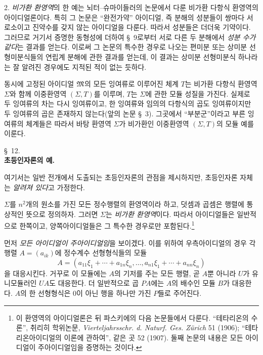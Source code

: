 2. \emph{비가환 환영역}의 한 예는 뇌터--슈마이들러의 논문에서 다룬 비가환 다항식 환영역의 아이디얼론이다. 특히 그 논문은 ``완전가약'' 아이디얼, 즉 분해의 성분들이 쌍마다 서로소이고 진약수를 갖지 않는 아이디얼을 다룬다. 따라서 성분들은 더더욱 기약이다. 그러므로 거기서 증명한 동형성에 더하여 \S~9로부터 서로 다른 두 분해에서 \emph{성분 수가 같다}는 결과를 얻는다. 이로써 그 논문의 특수한 경우로 나오는 편미분 또는 상미분 선형미분식들의 연립계 분해에 관한 결과를 얻는데, 이 결과는 상미분 선형미분식 하나라는 잘 알려진 경우에도 지적된 적이 없는 듯하다.

동시에 고정된 아이디얼 $\mathfrak{M}$의 모든 잉여류로 이루어진 체계 $T$는 비가환 다항식 환영역 $\Sigma$와 함께 이중환영역 $(\Sigma,T)$를 이루며, $T$는 $\Sigma$에 관한 모듈 성질을 가진다. 실제로 두 잉여류의 차는 다시 잉여류이고, 한 잉여류와 임의의 다항식의 곱도 잉여류이지만 두 잉여류의 곱은 존재하지 않는다(앞의 논문 \S~3). 그곳에서 ``부분군''이라고 부른 잉여류의 체계들은 따라서 바탕 환영역 $\Sigma$가 비가환인 이중환영역 $(\Sigma,T)$의 모듈 예를 이룬다.

\begin{center}
\S~12.\\[0.25em]
\textbf{초등인자론의 예.}
\end{center}

여기서는 일반 전개에서 도출되는 초등인자론의 관점을 제시하지만, 초등인자론 자체는 \emph{알려져 있다}고 가정한다.

$\Sigma$를 $n^2$개의 원소를 가진 모든 정수행렬의 환영역이라 하고, 덧셈과 곱셈은 행렬에 통상적인 뜻으로 정의하자. 그러면 $\Sigma$는 \emph{비가환 환영역}이다. 따라서 아이디얼들은 일반적으로 한쪽이고, 양쪽아이디얼들은 그 특수한 경우로만 포함된다.\footnote{이 환영역의 아이디얼론은 뒤 파스키에의 다음 논문들에서 다룬다. ``테타리온의 수론'', 취리히 학위논문, \emph{Vierteljahrsschr. d. Naturf. Ges. Zürich} 51 (1906); ``테타리온아이디얼의 이론에 관하여'', 같은 곳 52 (1907). 둘째 논문의 내용은 모든 아이디얼이 주아이디얼임을 증명하는 것이다.}

먼저 \emph{모든 아이디얼이 주아이디얼임}을 보이겠다. 이를 위하여 우측아이디얼의 경우 각 행렬 $A=(a_{ik})$에 정수계수 선형형식들의 모듈
\[
 A=(a_{11}\xi_1+\cdots+a_{1n}\xi_n,\ldots,
 a_{n1}\xi_1+\cdots+a_{nn}\xi_n)
\]
을 대응시킨다. 거꾸로 이 모듈에는 $A$의 기저를 주는 모든 행렬, 곧 $A$뿐 아니라 $U$가 유니모듈러인 $UA$도 대응한다. 더 일반적으로 곱 $PA$에는 $A$의 배수인 모듈 $B$가 대응한다. $A$의 한 선형형식은 0이 아닌 행을 하나만 가진 $P$들로 주어진다.

